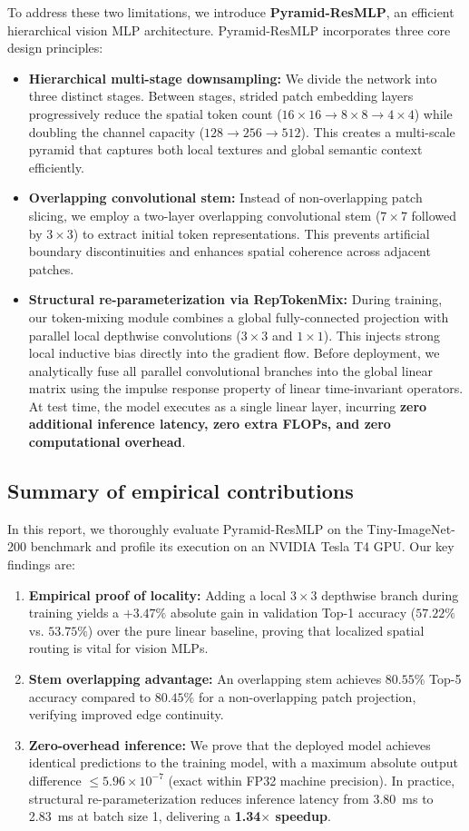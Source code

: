 To address these two limitations, we introduce \textbf{Pyramid-ResMLP}, an efficient hierarchical vision MLP architecture. Pyramid-ResMLP incorporates three core design principles:
\begin{itemize}
    \item \textbf{Hierarchical multi-stage downsampling:} We divide the network into three distinct stages. Between stages, strided patch embedding layers progressively reduce the spatial token count ($16 \times 16 \to 8 \times 8 \to 4 \times 4$) while doubling the channel capacity ($128 \to 256 \to 512$). This creates a multi-scale pyramid that captures both local textures and global semantic context efficiently.
    \item \textbf{Overlapping convolutional stem:} Instead of non-overlapping patch slicing, we employ a two-layer overlapping convolutional stem ($7 \times 7$ followed by $3 \times 3$) to extract initial token representations. This prevents artificial boundary discontinuities and enhances spatial coherence across adjacent patches.
    \item \textbf{Structural re-parameterization via RepTokenMix:} During training, our token-mixing module combines a global fully-connected projection with parallel local depthwise convolutions ($3 \times 3$ and $1 \times 1$). This injects strong local inductive bias directly into the gradient flow. Before deployment, we analytically fuse all parallel convolutional branches into the global linear matrix using the impulse response property of linear time-invariant operators. At test time, the model executes as a single linear layer, incurring \textbf{zero additional inference latency, zero extra FLOPs, and zero computational overhead}.
\end{itemize}

\subsection{Summary of empirical contributions}
In this report, we thoroughly evaluate Pyramid-ResMLP on the Tiny-ImageNet-200 benchmark and profile its execution on an NVIDIA Tesla T4 GPU. Our key findings are:
\begin{enumerate}
    \item \textbf{Empirical proof of locality:} Adding a local $3 \times 3$ depthwise branch during training yields a $+3.47\%$ absolute gain in validation Top-1 accuracy ($57.22\%$ vs. $53.75\%$) over the pure linear baseline, proving that localized spatial routing is vital for vision MLPs.
    \item \textbf{Stem overlapping advantage:} An overlapping stem achieves $80.55\%$ Top-5 accuracy compared to $80.45\%$ for a non-overlapping patch projection, verifying improved edge continuity.
    \item \textbf{Zero-overhead inference:} We prove that the deployed model achieves identical predictions to the training model, with a maximum absolute output difference $\le 5.96 \times 10^{-7}$ (exact within FP32 machine precision). In practice, structural re-parameterization reduces inference latency from 3.80~ms to 2.83~ms at batch size 1, delivering a \textbf{1.34$\times$ speedup}.
\end{enumerate}
